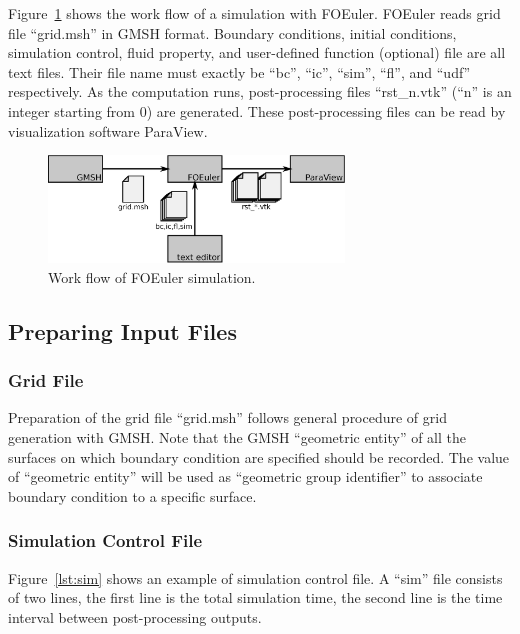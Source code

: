 \documentclass[]{article}
\begin{document}
Figure~\ref{fig:flow} shows the work flow of a simulation with FOEuler.
FOEuler reads grid file ``grid.msh'' in GMSH format.
Boundary conditions, initial conditions, simulation control, fluid property, and user-defined
function (optional) file are all text files.
Their file name must exactly be ``bc'', ``ic'', ``sim'', ``fl'', and ``udf'' respectively.
As the computation runs, post-processing files ``rst\_n.vtk'' (``n'' is an integer starting from 0)
are generated.
These post-processing files can be read by visualization software ParaView.

\begin{figure}[h!]
  \centering
  \includegraphics[width=0.7\textwidth]{flow.eps}
  \caption{Work flow of FOEuler simulation.}
  \label{fig:flow}
\end{figure}

\subsection{Preparing Input Files}

\subsubsection{Grid File}
\label{sec:grid}

Preparation of the grid file ``grid.msh'' follows general procedure of grid generation with GMSH.
Note that the GMSH ``geometric entity'' of all the surfaces on which boundary condition are
specified should be recorded.
The value of ``geometric entity'' will be used as ``geometric group identifier'' to associate
boundary condition to a specific surface.

\subsubsection{Simulation Control File}

Figure~\ref{lst:sim} shows an example of simulation control file.
A ``sim'' file consists of two lines, the first line is the total simulation time, the second line
is the time interval between post-processing outputs.
\end{document}
